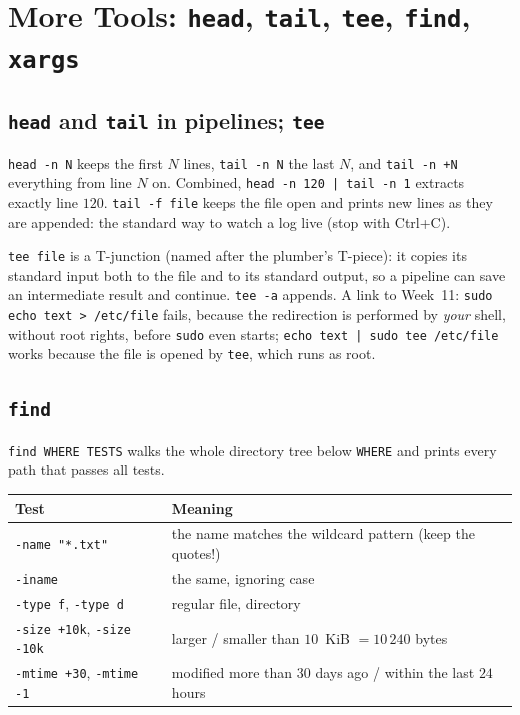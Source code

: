 \documentclass[11pt,a4paper]{article}
\newcommand{\cmd}[1]{\texttt{#1}}
\begin{document}
\section{More Tools: \texttt{head}, \texttt{tail}, \texttt{tee}, \texttt{find}, \texttt{xargs}}
\label{sec:more}

\subsection{\texttt{head} and \texttt{tail} in pipelines; \texttt{tee}}



\cmd{head -n N} keeps the first $N$ lines, \cmd{tail -n N} the last $N$, and \cmd{tail -n +N} everything from line $N$ on. Combined, \cmd{head -n 120 | tail -n 1} extracts exactly line $120$. \cmd{tail -f file} keeps the file open and prints new lines as they are appended: the standard way to watch a log live (stop with Ctrl+C).

\cmd{tee file} is a T-junction (named after the plumber's T-piece): it copies its standard input both to the file and to its standard output, so a pipeline can save an intermediate result and continue. \cmd{tee -a} appends. A link to Week~11: \cmd{sudo echo text > /etc/file} fails, because the redirection is performed by \emph{your} shell, without root rights, before \cmd{sudo} even starts; \cmd{echo text | sudo tee /etc/file} works because the file is opened by \cmd{tee}, which runs as root.

\subsection{\texttt{find}}

\cmd{find WHERE TESTS} walks the whole directory tree below \texttt{WHERE} and prints every path that passes all tests.



\begin{center}
\renewcommand{\arraystretch}{1.2}
\begin{tabular}{@{}lp{10.5cm}@{}}
\toprule
\textbf{Test} & \textbf{Meaning}\\
\midrule
\cmd{-name "*.txt"} & the name matches the wildcard pattern (keep the quotes!)\\
\cmd{-iname} & the same, ignoring case\\
\cmd{-type f}, \cmd{-type d} & regular file, directory\\
\cmd{-size +10k}, \cmd{-size -10k} & larger / smaller than $10$~KiB $= 10\,240$ bytes\\
\cmd{-mtime +30}, \cmd{-mtime -1} & modified more than $30$ days ago / within the last $24$ hours\\
\bottomrule
\end{tabular}
\end{center}
\end{document}
